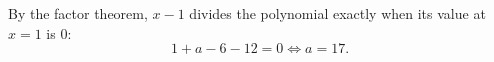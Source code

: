 By the factor theorem, $x-1$ divides the polynomial exactly when its value at $x=1$ is $0$:
\[
1+a-6-12=0\iff a=\boxed{17}.
\]
